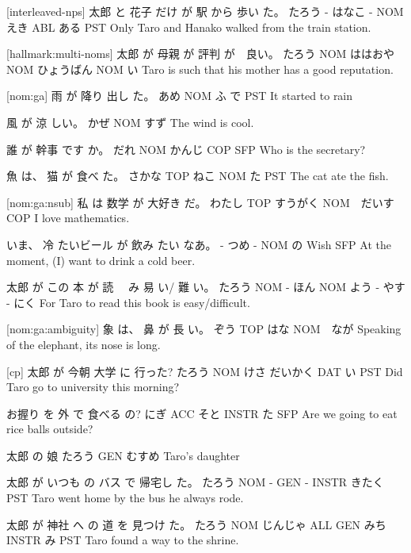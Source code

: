 [interleaved-nps]
太郎  と 花子  だけ が  駅  から 歩い  た。
たろう - はなこ -  NOM えき ABL ある  PST
Only Taro and Hanako walked from the train station.

[hallmark:multi-noms]
太郎  が   母親    が   評判      が　良い。
たろう NOM ははおや NOM ひょうばん NOM い
Taro is such that his mother has a good reputation.

[nom:ga]
雨  が   降り 出し た。
あめ NOM ふ   で PST
It started to rain

風  が   涼 しい。
かぜ NOM すず
The wind is cool.

誰  が   幹事   です か。
だれ NOM かんじ  COP SFP
Who is the secretary?

魚    は、 猫   が  食べ た。
さかな TOP ねこ NOM た  PST
The cat ate the fish.

[nom:ga:nsub]
私    は   数学    が   大好き だ。
わたし TOP すうがく NOM　だいす COP
I love mathematics.

いま、 冷  たいビール が  飲み たい なあ。
-    つめ -       NOM  の  Wish SFP
At the moment, (I) want to drink a cold beer.

太郎   が この 本   が  読 　み 易 い/ 難 い。
たろう NOM -  ほん NOM よう - やす - にく
For Taro to read this book is easy/difficult.

[nom:ga:ambiguity]
象   は、 鼻  が   長 い。
ぞう TOP はな NOM　なが
Speaking of the elephant, its nose is long.

[cp]
太郎   が  今朝 大学    に   行った?
たろう NOM けさ だいかく DAT い PST
Did Taro go to university this morning?

お握り を   外  で      食べる の?
にぎ   ACC そと INSTR  た SFP
Are we going to eat rice balls outside?

太郎   の   娘
たろう GEN むすめ
Taro's daughter

太郎   が いつも の  バス で    帰宅し た。
たろう NOM -    GEN -   INSTR きたく PST
Taro went home by the bus he always rode.

太郎   が  神社    へ   の  道   を    見つけ た。
たろう NOM じんじゃ ALL GEN みち INSTR み    PST
Taro found a way to the shrine.

